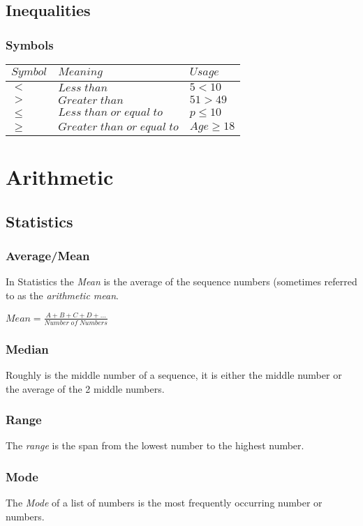 \documentclass{article}
\begin{document}
\subsection{Inequalities}
\subsubsection{Symbols}
\begin{tabular}{l|l|l}
$Symbol$ & $Meaning$ & $Usage$  \\
\hline
$<$ & $Less\;than$ & $ 5 < 10$  \\
$>$ & $Greater\;than$ & $ 51 > 49$  \\
$\leq$ & $Less\;than\;or\;equal\;to$ & $ p \leq 10$  \\
$\geq$ & $Greater\;than\;or\;equal\;to$ & $ Age \geq 18$  \\
\hline
\end{tabular}

\newpage
\section{Arithmetic}
\subsection{Statistics}

\subsubsection{Average/Mean}
In Statistics the \textit{Mean} is the average of the sequence numbers (sometimes referred to as the \textit{arithmetic mean}.

$
Mean = \frac{A + B + C + D + ...}{Number\; of\; Numbers}
$

\subsubsection{Median}
Roughly is the middle number of a sequence, it is either the middle number or the average of the 2 middle numbers.

\subsubsection{Range}
The \textit{range} is the span from the lowest number to the highest number.

\subsubsection{Mode}
The \textit{Mode} of a list of numbers is the most frequently occurring number or numbers.
\end{document}
